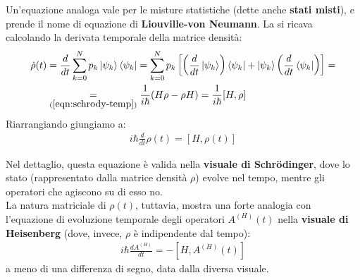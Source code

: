 \documentclass[../../InformazioneQuantistica.tex]{subfiles}
\begin{document}
Un'equazione analoga vale per le misture statistiche (dette anche \textbf{stati misti}), e prende il nome di equazione di \textbf{Liouville-von Neumann}. La si ricava calcolando la derivata temporale della matrice densità:
\begin{align*}
\dot{\rho}(t) &=\frac{d}{dt} \sum_{k=0}^N p_k \Ket{\psi_k}\Bra{\psi_k} = \sum_{k=0}^N p_k \left[\left(\frac{d}{dt}\Ket{\psi_k}\right) \Bra{\psi_k} + \Ket{\psi_k}\left(\frac{d}{dt}\Bra{\psi_k}\right)\right]=\\
&\underset{(\ref{eqn:schrody-temp})}{=} \frac{1}{i\hbar}(H\rho - \rho H) = \frac{1}{i\hbar}[H,\rho]
\end{align*}
Riarrangiando giungiamo a:
\begin{align*}
i\hbar \frac{d}{dt}\rho(t) =[H,\rho(t)]
\end{align*}
\begin{expl}
Nel dettaglio, questa equazione è valida nella \textbf{visuale di Schr\"odinger}, dove lo stato (rappresentato dalla matrice densità $\rho$) evolve nel tempo, mentre gli operatori che agiscono su di esso no.\\
La natura matriciale di $\rho(t)$, tuttavia, mostra una forte analogia con l'equazione di evoluzione temporale degli operatori $A^{(H)}(t)$ nella \textbf{visuale di Heisenberg} (dove, invece, $\rho$ è indipendente dal tempo):
\begin{align*}
i\hbar\frac{d A^{(H)}}{dt} = -[H,A^{(H)}(t)]
\end{align*}
a meno di una differenza di segno, data dalla diversa visuale.
\end{expl}
\end{document}
